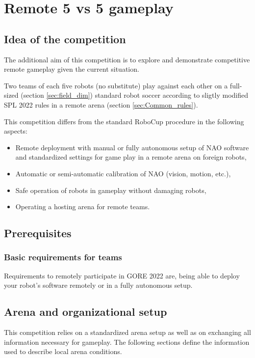 \section{Remote 5 vs 5 gameplay}
\label{sec:OneVsOneChallenge}

\subsection{Idea of the competition}
The additional aim of this competition is to explore and demonstrate competitive remote gameplay given the current situation.

Two teams of each five robots (no substitute) play against each other on a full-sized (\cf section \ref{sec:field_dim}) standard robot soccer according to sligtly modified SPL 2022 rules in a remote arena (\cf section \ref{sec:Common_rules}). 

This competition differs from the standard RoboCup procedure in the following aspects:
\begin{itemize}
    \item Remote deployment with manual or fully autonomous setup of NAO software and standardized settings for game play in a remote arena on foreign robots,
    \item Automatic or semi-automatic calibration of NAO (vision, motion, etc.), 
    \item Safe operation of robots in gameplay without damaging robots,
    \item Operating a hosting arena for remote teams. 
\end{itemize}

\subsection{Prerequisites}
\label{sec:c3_Prerequisites}

\subsubsection{Basic requirements for teams}

Requirements to remotely participate in GORE 2022 are, being able to deploy your robot's software remotely or in a fully autonomous setup.

\subsection{Arena and organizational setup}
\label{sec:arean-org-setup}
This competition relies on a standardized arena setup as well as on exchanging all information necessary for gameplay. The following sections define the information used to describe local arena conditions.

